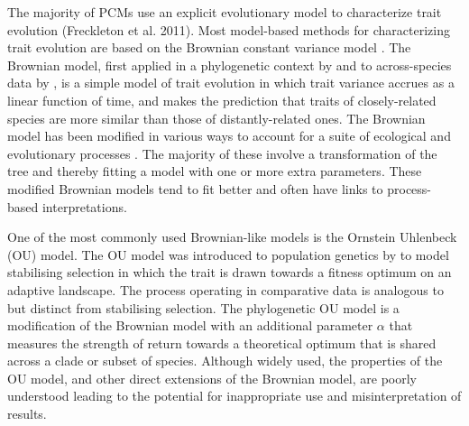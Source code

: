 \documentclass[a4paper,12pt]{article}
\begin{document}
  The majority of PCMs use an explicit evolutionary model to characterize trait evolution (Freckleton et al. 2011). Most model-based methods for characterizing trait evolution are based on the Brownian constant variance model \citep[for exceptions see][]{price1997correlated,harvey2000comparative,freckleton2006detecting}. 
  The Brownian model, first applied in a phylogenetic context by \citet{cavalli1967} and to across-species data by \citet{felsenstein1973maximum}, is a simple model of trait evolution in which trait variance accrues as a linear function of time, and makes the prediction that traits of closely-related species are more similar than those of distantly-related ones. 
  The Brownian model has been modified in various ways to account for a suite of ecological and evolutionary processes \citep[e.g.,][]{grafen1989phylogenetic,hansen1997stabilizing,Pagel:1997aa,Pagel:1999aa}. 
  The majority of these involve a transformation of the tree and thereby fitting a model with one or more extra parameters. 
  These modified Brownian models tend to fit better and often have links to process-based interpretations. 

  One of the most commonly used Brownian-like models is the Ornstein Uhlenbeck (OU) model. 
  The OU model was introduced to population genetics by \cite{Lande:1976aa} to model stabilising selection in which the trait is drawn towards a fitness optimum on an adaptive landscape. 
  The process operating in comparative data is analogous to but distinct from stabilising selection. The phylogenetic OU model is a modification of the Brownian model with an additional parameter $\alpha$ that measures the strength of return towards a theoretical optimum \citep{hansen1997stabilizing} that is shared across a clade or subset of species.
  Although widely used, the properties of the OU model, and other direct extensions of the Brownian model, are poorly understood leading to the potential for inappropriate use and misinterpretation of results.
\end{document}
